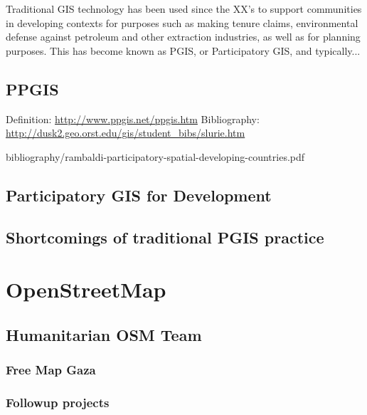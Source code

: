 \documentclass[11pt]{report}
\begin{document}
Traditional GIS technology has been used since the XX's to support communities in developing contexts for purposes such as making tenure claims, environmental defense against petroleum and other extraction industries, as well as for planning purposes. This has become known as PGIS, or Participatory GIS, and typically... 


\subsection{PPGIS}

Definition: \url{http://www.ppgis.net/ppgis.htm}
Bibliography: \url{http://dusk2.geo.orst.edu/gis/student_bibs/slurie.htm}


bibliography/rambaldi-participatory-spatial-developing-countries.pdf

\subsection{Participatory GIS for Development}
\subsection{Shortcomings of traditional PGIS practice}
\section{OpenStreetMap}


\subsection{Humanitarian OSM Team}
\subsubsection{Free Map Gaza}
\subsubsection{Followup projects}
\end{document}
